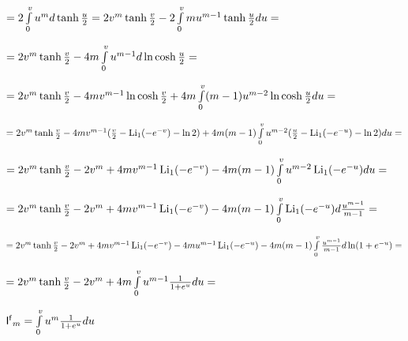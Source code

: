 \documentclass[a4paper,12pt]{article}
\begin{document}
\begin{center}
    $= 2\int\limits_{0}^v u^m d\operatorname{tanh}{u\over{2}} = 2v^m \operatorname{tanh}{v\over{2}} - 2\int\limits_0^v m u^{m - 1} \operatorname{tanh}{u\over{2}}d u = $
\end{center}

\begin{center}
    $= 2v^m \operatorname{tanh}{v\over{2}} - 4 m \int\limits_0^v u^{m - 1} d \ln{\operatorname{cosh}{u\over{2}}} =$
\end{center}

\begin{center}
    $= 2v^m \operatorname{tanh}{v\over{2}} - 4 m v^{m - 1} \ln{\operatorname{cosh}{v\over{2}}} + 4m\int\limits_0^v (m - 1) u^{m - 2} \ln{\operatorname{cosh}{u\over{2}}} d u  =$
\end{center}

\begin{center}
    $= 2v^m \operatorname{tanh}{v\over{2}} - 4 m v^{m - 1}({v\over{2}} - \operatorname{Li_1}(-e^{-v}) - \ln{2}) + 4m(m - 1) \int\limits_0^v u^{m - 2} ({u\over{2}} - \operatorname{Li_1}(-e^{-u}) - \ln{2}) d u  =$
\end{center}

\begin{center}
    $= 2v^m \operatorname{tanh}{v\over{2}} - 2v^m + 4m v^{m - 1}\operatorname{Li_1}(-e^{-v}) - 4m(m - 1) \int\limits_0^v u^{m - 2} \operatorname{Li_1}(-e^{-u}) d u  =$
\end{center}

\begin{center}
    $= 2v^m \operatorname{tanh}{v\over{2}} - 2v^m + 4m v^{m - 1}\operatorname{Li_1}(-e^{-v}) - 4m(m - 1) \int\limits_0^v \operatorname{Li_1}(-e^{-u}) d {u^{m - 1}\over{m - 1}}  =$
\end{center}

\begin{center}
    $= 2v^m \operatorname{tanh}{v\over{2}} - 2v^m + 4m v^{m - 1}\operatorname{Li_1}(-e^{-v}) - 4m u^{m - 1}\operatorname{Li_1}(-e^{-u}) - 4m(m - 1)\int\limits_0^v {u^{m - 1}\over{m - 1}} d\ln(1 + e^{-u}) =$
\end{center}

\begin{center}
    $= 2v^m \operatorname{tanh}{v\over{2}} - 2v^m + 4m\int\limits_0^v u^{m - 1} {1\over{1 + e^{u}}}d u =$
\end{center}

 $\mathsf{I^f}_m = \int\limits_0^v u^{m} {1\over{1 + e^{u}}}d u$
\end{document}
